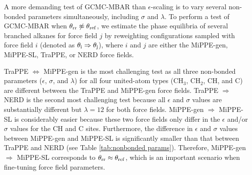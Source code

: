 \documentclass[journal=jced,manuscript=article]{achemso}
\begin{document}
A more demanding test of GCMC-MBAR than $\epsilon$-scaling is to vary several non-bonded parameters simultaneously, including $\sigma$ and $\lambda$. To perform a test of GCMC-MBAR when $\theta_{\rm rr} \not\approx \theta_{\rm ref}$, we estimate the phase equilibria of several branched alkanes for force field $j$ by reweighting configurations sampled with force field $i$ (denoted as $\theta_{\rm i} \Rightarrow \theta_{\rm j}$), where $i$ and $j$ are either the MiPPE-gen, MiPPE-SL, TraPPE, or NERD force fields. 

TraPPE $\Leftrightarrow$ MiPPE-gen is the most challenging test as all three non-bonded parameters ($\epsilon$, $\sigma$, and $\lambda$) for all four united-atom types (CH$_3$, CH$_2$, CH, and C) are different between the TraPPE and MiPPE-gen force fields. TraPPE $\Rightarrow$ NERD is the second most challenging test because all $\epsilon$ and $\sigma$ values are substantially different but $\lambda = 12$ for both force fields. MiPPE-gen $\Rightarrow$ MiPPE-SL is considerably easier because these two force fields only differ in the $\epsilon$ and/or $\sigma$ values for the CH and C sites. Furthermore, the difference in $\epsilon$ and $\sigma$ values between MiPPE-gen and MiPPE-SL is significantly smaller than that between TraPPE and NERD (see Table \ref{tab:nonbonded params}). Therefore, MiPPE-gen $\Rightarrow$ MiPPE-SL corresponds to $\theta_{\rm rr} \approx \theta_{\rm ref}$, which is an important scenario when fine-tuning force field parameters.


\end{document}
